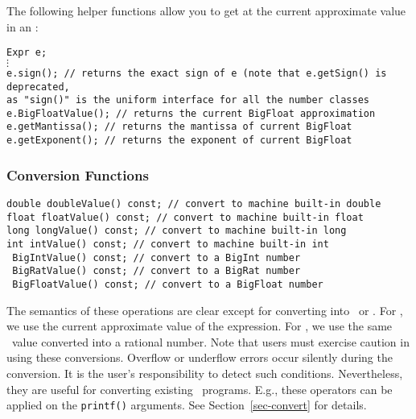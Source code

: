 The following helper functions allow you to get at the
current approximate value in an \expr:

\nopagebreak
\begin{progb}{
\> \tt Expr e; \\
\> \tt $\vdots$ \\
\> \tt e.sign(); // returns the exact sign of e (note that e.getSign() is deprecated,\\
\> \>\>\> as "sign()" is the uniform interface for all the number classes\\
\> \tt e.BigFloatValue(); // returns the current BigFloat approximation \\
\> \tt e.getMantissa(); // returns the mantissa of current BigFloat \\
\> \tt e.getExponent(); // returns the exponent of current BigFloat \\
}\end{progb}

\subsubsection{Conversion Functions}
\label{sec-expr-cast}
\begin{progb} {
\> \tt 	 double doubleValue() const; \>\>\>\>\>\>\> // convert to machine built-in double\\
\> \tt 	 float  floatValue()  const; \>\>\>\>\>\>\> // convert to machine built-in float\\
\> \tt 	 long   longValue()   const; \>\>\>\>\>\>\> // convert to machine built-in long\\
\> \tt 	 int    intValue()    const; \>\>\>\>\>\>\> // convert to machine built-in int\\
\> \tt 	 \Int\  BigIntValue() const; \>\>\>\>\>\>\> // convert to a BigInt number\\
\> \tt 	 \Rat\  BigRatValue() const; \>\>\>\>\>\>\> // convert to a BigRat number\\
\> \tt 	 \BF\  BigFloatValue() const; \>\>\>\>\>\>\> // convert to a BigFloat number\\
}\end{progb}

The semantics of these operations are clear except for converting into
\Rat\ or \BF.  For \BF, we use the current approximate  value of the
expression. For \Rat, we use the same \BF\ value converted into a rational number.
Note that users must exercise caution in using these conversions. 
Overflow or underflow errors occur silently during the conversion. 
It is the user's responsibility to detect such conditions.
Nevertheless, they are useful for converting 
existing \candcpp\ programs.  E.g.,
these operators can be applied on the {\tt printf()} arguments. See 
Section~\ref{sec-convert} for details.

